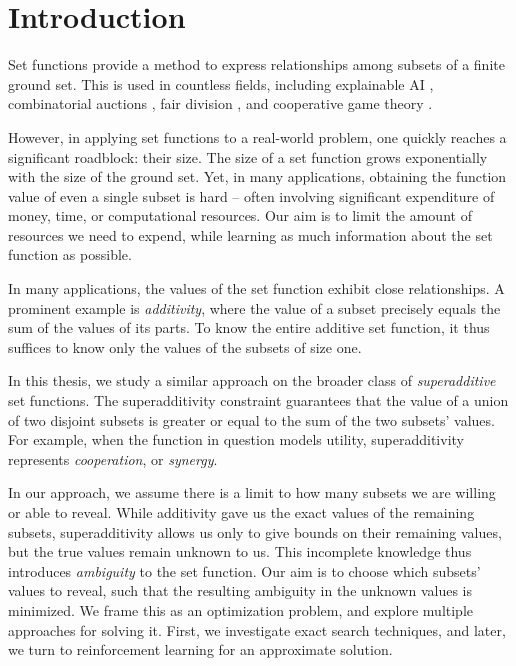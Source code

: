 \chapter*{Introduction}

Set functions provide a method to express relationships among subsets of a finite ground set.
This is used in countless fields, including explainable AI \citep{lundberg2017shap}, combinatorial auctions \citep{doi:10.1287/ijoc.15.3.284.16077}, fair division \citep{brandt2016handbook}, and cooperative game theory \citep{grabisch2016set,peters2015game}.

However, in applying set functions to a real-world problem, one quickly reaches a significant roadblock: their size.
The size of a set function grows exponentially with the size of the ground set.
Yet, in many applications, obtaining the function value of even a single subset is hard – often involving significant expenditure of money, time, or computational resources.
Our aim is to limit the amount of resources we need to expend, while learning as much information about the set function as possible.

In many applications, the values of the set function exhibit close relationships.
A prominent example is \emph{additivity}, where the value of a subset precisely equals the sum of the values of its parts.
To know the entire additive set function, it thus suffices to know only the values of the subsets of size one.

In this thesis, we study a similar approach on the broader class of \emph{superadditive} set functions.
The superadditivity constraint guarantees that the value of a union of two disjoint subsets is greater or equal to the sum of the two subsets' values.
For example, when the function in question models utility, superadditivity represents \emph{cooperation}, or \emph{synergy}.


In our approach, we assume there is a limit to how many subsets we are willing or able to reveal.
While additivity gave us the exact values of the remaining subsets, superadditivity allows us only to give bounds on their remaining values, but the true values remain unknown to us.
This incomplete knowledge thus introduces \emph{ambiguity} to the set function.
Our aim is to choose which subsets' values to reveal, such that the resulting ambiguity in the unknown values is minimized.
We frame this as an optimization problem, and explore multiple approaches for solving it.
First, we investigate exact search techniques, and later, we turn to reinforcement learning for an approximate solution.

